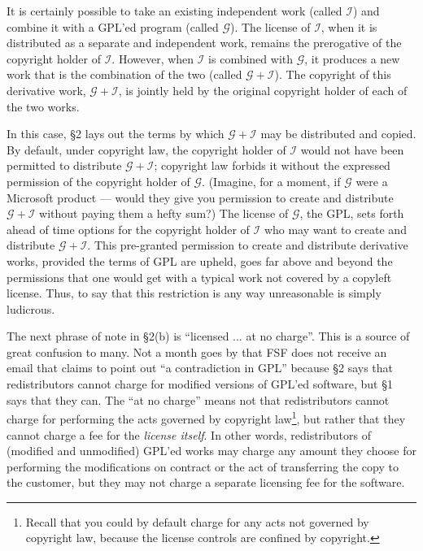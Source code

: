 \documentclass[12pt]{report}
\begin{document}
\newcommand{\gplusi}{$\mathcal{G\!\!+\!\!I}$}
\newcommand{\worki}{$\mathcal{I}$}
\newcommand{\workg}{$\mathcal{G}$}

It is certainly possible to take an existing independent work (called
\worki{}) and combine it with a GPL'ed program (called \workg{}).  The
license of \worki{}, when it is distributed as a separate and independent
work, remains the prerogative of the copyright holder of \worki{}.
However, when \worki{} is combined with \workg{}, it produces a new work
that is the combination of the two (called \gplusi{}).  The copyright of
this derivative work, \gplusi{}, is jointly held by the original copyright
holder of each of the two works.

In this case, \S 2 lays out the terms by which \gplusi{} may be
distributed and copied.  By default, under copyright law, the copyright
holder of \worki{} would not have been permitted to distribute \gplusi{};
copyright law forbids it without the expressed permission of the copyright
holder of \workg{}.  (Imagine, for a moment, if \workg{} were a Microsoft
product --- would they give you permission to create and distribute
\gplusi{} without paying them a hefty sum?)  The license of \workg{}, the
GPL, sets forth ahead of time options for the copyright holder of \worki{}
who may want to create and distribute \gplusi{}.  This pre-granted
permission to create and distribute derivative works, provided the terms
of GPL are upheld, goes far above and beyond the permissions that one
would get with a typical work not covered by a copyleft license.  Thus, to
say that this restriction is any way unreasonable is simply ludicrous.

\medskip

The next phrase of note in \S 2(b) is ``licensed ... at no charge''.  This
is a source of great confusion to many.  Not a month goes by that FSF does
not receive an email that claims to point out ``a contradiction in GPL''
because \S 2 says that redistributors cannot charge for modified versions
of GPL'ed software, but \S 1 says that they can.  The ``at no charge''
means not that redistributors cannot charge for performing the acts
governed by copyright law\footnote{Recall that you could by default charge
  for any acts not governed by copyright law, because the license controls
  are confined by copyright.}, but rather that they cannot charge a fee
for the \emph{license itself}.  In other words, redistributors of
(modified and unmodified) GPL'ed works may charge any amount they choose
for performing the modifications on contract or the act of transferring
the copy to the customer, but they may not charge a separate licensing fee
for the software.
\end{document}
